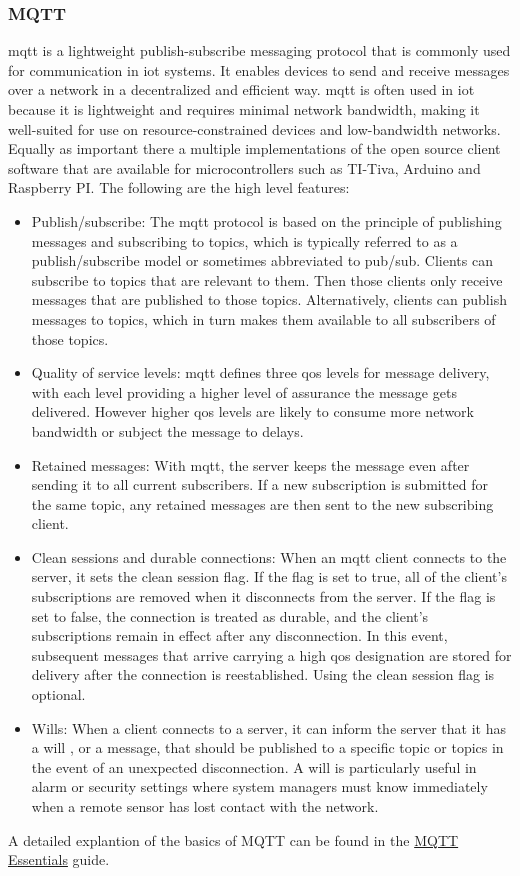 \subsubsection{MQTT}
\gls{mqtt} is a lightweight publish-subscribe messaging protocol that is commonly used for communication in \gls{iot} systems. It enables devices to send and receive messages over a network in a decentralized and efficient way. \gls{mqtt} is often used in \gls{iot} because it is lightweight and requires minimal network bandwidth, making it well-suited for use on resource-constrained devices and low-bandwidth networks. Equally as important there a multiple implementations of the open source client software that are available for microcontrollers such as TI-Tiva, Arduino and Raspberry PI. The following are the high level features:
\begin{itemize}
\item Publish/subscribe: The \gls{mqtt} protocol is based on the principle of publishing messages and subscribing to topics, which is typically referred to as a publish/subscribe model or sometimes abbreviated to pub/sub. Clients can subscribe to topics that are relevant to them. Then those clients only receive messages that are published to those topics. Alternatively, clients can publish messages to topics, which in turn makes them available to all subscribers of those topics.
\item Quality of service levels: \gls{mqtt} defines three \gls{qos} levels for message delivery, with each level providing a higher level of assurance the message gets delivered. However higher \gls{qos} levels are likely to consume more network bandwidth or subject the message to delays.
\item Retained messages: With \gls{mqtt}, the server keeps the message even after sending it to all current subscribers. If a new subscription is submitted for the same topic, any retained messages are then sent to the new subscribing client.
\item Clean sessions and durable connections: When an \gls{mqtt} client connects to the server, it sets the clean session flag. If the flag is set to true, all of the client’s subscriptions are removed when it disconnects from the server. If the flag is set to false, the connection is treated as durable, and the client’s subscriptions remain in effect after any disconnection. In this event, subsequent messages that arrive carrying a high \gls{qos} designation are stored for delivery after the connection is reestablished. Using the clean session flag is optional.
\item Wills: When a client connects to a server, it can inform the server that it has a will , or a message, that should be published to a specific topic or topics in the event of an unexpected disconnection. A will is particularly useful in alarm or security settings where system managers must know immediately when a remote sensor has lost contact with the network.
\end{itemize}
A detailed explantion of the basics of MQTT can be found in the \href{https://www.hivemq.com/mqtt-essentials/}{MQTT Essentials} guide.

